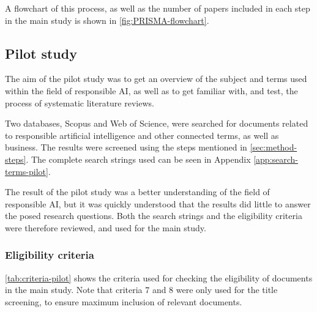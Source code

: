 A flowchart of this process, as well as the number of papers included in each step in the main study is shown in \autoref{fig:PRISMA-flowchart}.


\subsection{Pilot study}
The aim of the pilot study was to get an overview of the subject and terms used within the field of responsible AI, as well as to get familiar with, and test, the process of systematic literature reviews. 

Two databases, Scopus and Web of Science, were searched for documents related to responsible artificial intelligence and other connected terms, as well as business. The results were screened using the steps mentioned in \autoref{sec:method-steps}. The complete search strings used can be seen in Appendix \ref{app:search-terms-pilot}.

The result of the pilot study was a better understanding of the field of responsible AI, but it was quickly understood that the results did little to answer the posed research questions. Both the search strings and the eligibility criteria were therefore reviewed, and used for the main study.

\subsubsection{Eligibility criteria}
\autoref{tab:criteria-pilot} shows the criteria used for checking the eligibility of documents in the main study. Note that criteria 7 and 8 were only used for the title screening, to ensure maximum inclusion of relevant documents.

